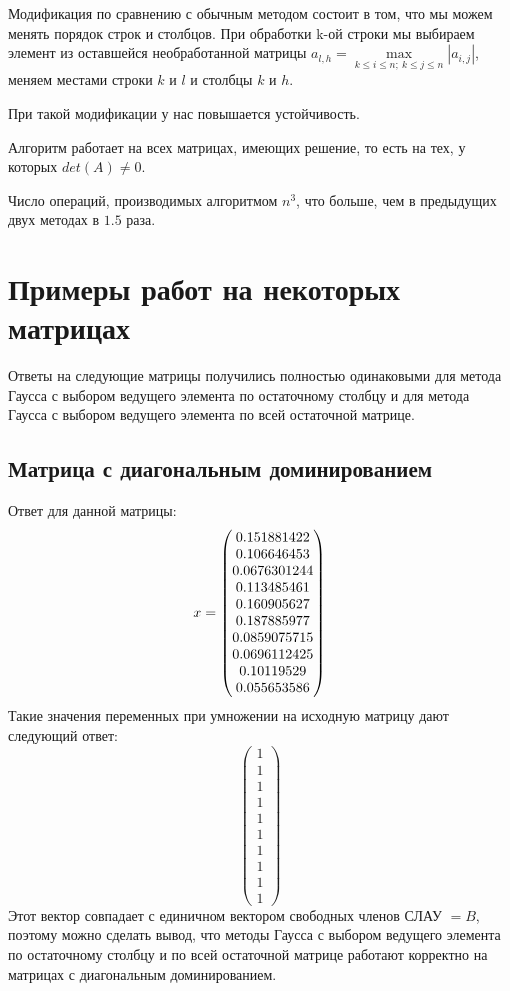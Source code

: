 \documentclass[../../report.tex]{subfiles}
\begin{document}
Модификация по сравнению с обычным методом состоит в том, что мы можем менять порядок строк и столбцов. При обработки {k}-ой строки мы выбираем элемент из оставшейся необработанной матрицы $a_{l,h}= \max \limits_{k \le i \le n;~k \le j \le n} |a_{i,j}|$, меняем местами строки $k$ и $l$ и столбцы $k$ и $h$.

При такой модификации у нас повышается устойчивость.

Алгоритм работает на всех матрицах, имеющих решение, то есть на тех, у которых $det(A) \neq 0$.

Число операций, производимых алгоритмом $n^3$, что больше, чем в предыдущих двух методах в $1.5$ раза.

\section{Примеры работ на некоторых матрицах}
Ответы на следующие матрицы получились полностью одинаковыми для метода Гаусса с выбором ведущего элемента по остаточному столбцу и для метода Гаусса с выбором ведущего элемента по всей остаточной матрице.

\subsection{Матрица с диагональным доминированием}
Ответ для данной матрицы:
\[
x = \begin{pmatrix} 0.151881422 \\ 0.106646453 \\ 0.0676301244 \\ 0.113485461 \\ 0.160905627 \\ 0.187885977 \\ 0.0859075715 \\ 0.0696112425 \\ 0.10119529 \\ 0.055653586 \end{pmatrix}
\]
Такие значения переменных при умножении на исходную матрицу дают следующий ответ:
\[
\begin{pmatrix}
1 \\
1 \\
1 \\
1 \\
1 \\
1 \\
1 \\
1 \\
1 \\
1
\end{pmatrix}
\]
Этот вектор совпадает с единичном вектором свободных членов СЛАУ $= B$, поэтому можно сделать вывод, что методы Гаусса с выбором ведущего элемента по остаточному столбцу и по всей остаточной матрице работают корректно на матрицах с диагональным доминированием.
\end{document}

